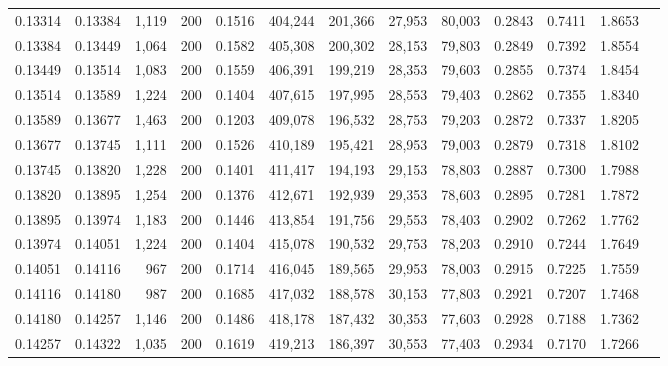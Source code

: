 \begin{tabular}{rrrrrrrrrrrrr}
0.13314 & 0.13384 &  1,119 & 200 &                                     0.1516 & 404,244 & 201,366 &  27,953 &  80,003 & 0.2843 & 0.7411 & 1.8653 \\
0.13384 & 0.13449 &  1,064 & 200 &                                     0.1582 & 405,308 & 200,302 &  28,153 &  79,803 & 0.2849 & 0.7392 & 1.8554 \\
0.13449 & 0.13514 &  1,083 & 200 &                                     0.1559 & 406,391 & 199,219 &  28,353 &  79,603 & 0.2855 & 0.7374 & 1.8454 \\
0.13514 & 0.13589 &  1,224 & 200 &                                     0.1404 & 407,615 & 197,995 &  28,553 &  79,403 & 0.2862 & 0.7355 & 1.8340 \\
0.13589 & 0.13677 &  1,463 & 200 &                                     0.1203 & 409,078 & 196,532 &  28,753 &  79,203 & 0.2872 & 0.7337 & 1.8205 \\
0.13677 & 0.13745 &  1,111 & 200 &                                     0.1526 & 410,189 & 195,421 &  28,953 &  79,003 & 0.2879 & 0.7318 & 1.8102 \\
0.13745 & 0.13820 &  1,228 & 200 &                                     0.1401 & 411,417 & 194,193 &  29,153 &  78,803 & 0.2887 & 0.7300 & 1.7988 \\
0.13820 & 0.13895 &  1,254 & 200 &                                     0.1376 & 412,671 & 192,939 &  29,353 &  78,603 & 0.2895 & 0.7281 & 1.7872 \\
0.13895 & 0.13974 &  1,183 & 200 &                                     0.1446 & 413,854 & 191,756 &  29,553 &  78,403 & 0.2902 & 0.7262 & 1.7762 \\
0.13974 & 0.14051 &  1,224 & 200 &                                     0.1404 & 415,078 & 190,532 &  29,753 &  78,203 & 0.2910 & 0.7244 & 1.7649 \\
0.14051 & 0.14116 &    967 & 200 &                                     0.1714 & 416,045 & 189,565 &  29,953 &  78,003 & 0.2915 & 0.7225 & 1.7559 \\
0.14116 & 0.14180 &    987 & 200 &                                     0.1685 & 417,032 & 188,578 &  30,153 &  77,803 & 0.2921 & 0.7207 & 1.7468 \\
0.14180 & 0.14257 &  1,146 & 200 &                                     0.1486 & 418,178 & 187,432 &  30,353 &  77,603 & 0.2928 & 0.7188 & 1.7362 \\
0.14257 & 0.14322 &  1,035 & 200 &                                     0.1619 & 419,213 & 186,397 &  30,553 &  77,403 & 0.2934 & 0.7170 & 1.7266 \\

\end{tabular}
